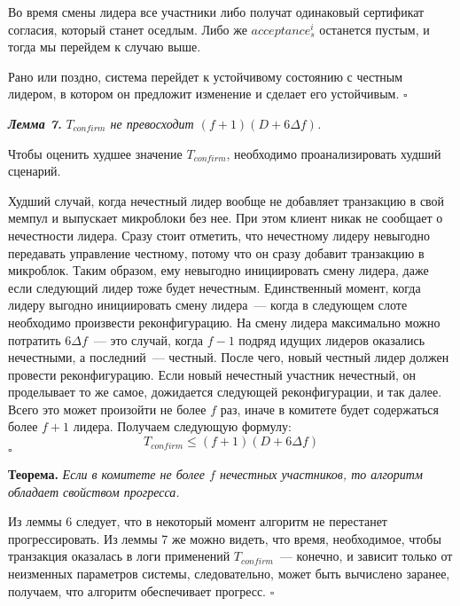 Во время смены лидера все участники либо получат одинаковый сертификат согласия, который станет оседлым. Либо же $acceptance_s^i$ останется пустым, и тогда мы перейдем к случаю выше.

Рано или поздно, система перейдет к устойчивому состоянию с честным лидером, в котором он предложит изменение и сделает его устойчивым. $\square$
\vspace{10pt}

\textbf{\textit{Лемма 7.}}  \textit{$T_{confirm}$ не превосходит $(f+1)(D+6\Delta f)$.}

Чтобы оценить худшее значение $T_{confirm}$, необходимо проанализировать худший сценарий.

Худший случай, когда нечестный лидер вообще не добавляет транзакцию в свой мемпул и выпускает микроблоки без нее. При этом клиент никак не сообщает о нечестности лидера. Сразу стоит отметить, что нечестному лидеру невыгодно передавать управление честному, потому что он сразу добавит транзакцию в микроблок. Таким образом, ему невыгодно инициировать смену лидера, даже если следующий лидер тоже будет нечестным. Единственный  момент, когда лидеру выгодно инициировать смену лидера~--- когда в следующем слоте необходимо произвести реконфигурацию. На смену лидера максимально можно потратить $6\Delta f$~--- это случай, когда $f-1$ подряд идущих лидеров оказались нечестными, а последний~--- честный.
После чего, новый честный лидер должен провести реконфигурацию. Если новый нечестный участник нечестный, он проделывает то же самое, дожидается следующей реконфигурации, и так далее. Всего это может произойти не более $f$ раз, иначе в комитете будет содержаться более $f+1$ лидера. Получаем следующую формулу:
$$ T_{confirm} \le (f+1)(D+6\Delta f)$$ $\square$

\textbf{Теорема.} \textit{Если в комитете не более $f$ нечестных участников, то алгоритм обладает свойством прогресса.}

Из леммы 6 следует, что в некоторый момент алгоритм не перестанет прогрессировать. Из леммы 7 же можно видеть, что время, необходимое, чтобы транзакция оказалась в логи применений $T_{confirm}$~--- конечно, и зависит только от неизменных параметров системы, следовательно, может быть вычислено заранее, получаем, что алгоритм обеспечивает прогресс. $\square$


